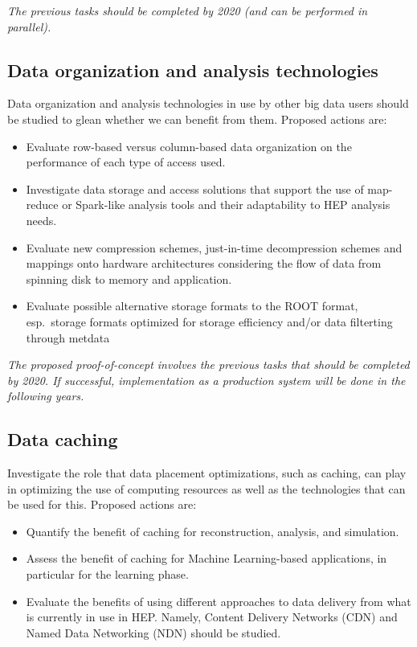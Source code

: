 \documentclass[12pt,a4paper]{article}
\begin{document}
\emph{The previous tasks should be completed by 2020 (and can be performed in parallel).}

\subsection{Data organization and analysis
technologies}\label{data-organization-and-analysis}
Data organization and analysis technologies in use by other big data users should be studied
to glean whether we can benefit from them. Proposed actions are:

\begin{itemize}
\item Evaluate row-based versus column-based
  data organization on the performance of each type of access used.
\item Investigate data storage and access solutions that support the use of map-reduce or
Spark-like analysis tools and their adaptability to HEP analysis needs.
\item Evaluate new compression schemes, just-in-time
  decompression schemes and mappings onto hardware architectures
  considering the flow of data from spinning disk to memory and
  application.
\item Evaluate possible alternative storage formats to the ROOT format, esp.\ storage formats optimized for storage efficiency and/or  data filterting through metdata
\end{itemize}

\emph{The proposed proof-of-concept involves the previous tasks that should be completed by 2020.
If successful, implementation as a production system will be done in the following years.}

\subsection{Data caching}\label{data-caching}
Investigate the role that data placement optimizations, such as caching, can play in optimizing
the use of computing resources as well as the technologies that can be used for this. Proposed actions are:

\begin{itemize}
\item Quantify the benefit of caching for reconstruction, analysis, and simulation.
\item Assess the benefit of caching for
  Machine Learning-based applications, in particular for the learning
  phase.
\item Evaluate the benefits of using different approaches to data delivery from what is currently in use in HEP.
Namely, Content Delivery Networks (CDN) and Named Data Networking (NDN) should be studied.
\end{itemize}
\end{document}
